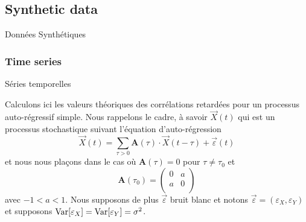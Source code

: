 







\subsection{Synthetic data}{Données Synthétiques}


\subsubsection{Time series}{Séries temporelles}


Calculons ici les valeurs théoriques des corrélations retardées pour un processus auto-régressif simple. Nous rappelons le cadre, à savoir $\vec{X}(t)$ qui est un processus stochastique suivant l'équation d'auto-régression
\[
\vec{X}(t) = \sum_{\tau > 0} \mathbf{A}(\tau) \cdot \vec{X}(t - \tau ) + \vec{\varepsilon}(t)
\]
et nous nous plaçons dans le cas où $\mathbf{A}(\tau) = 0$ pour $\tau \neq \tau_0$ et 
\[
\mathbf{A}(\tau_0) = \left( {\begin{array}{cc} 0 & a \\ a & 0 \\ \end{array}} \right)\]
avec $-1<a<1$. Nous supposons de plus $\vec{\varepsilon}$ bruit blanc et notons $\vec{\varepsilon} = (\varepsilon_X,\varepsilon_Y)$ et supposons $\operatorname{Var}\!\left[\varepsilon_X\right] = \operatorname{Var}\!\left[\varepsilon_Y\right] = \sigma^2$.

